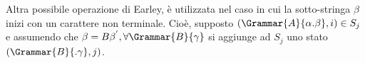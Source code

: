 \documentclass{subfiles}
\begin{document}
Altra possibile operazione di Earley, è utilizzata nel caso in cui la sotto-stringa \(\beta\) inizi con un carattere non terminale.
Cioè, supposto \((\Grammar{A}{\alpha . \beta} , i) \in S_{j}\) e assumendo che \(\beta = B\beta^{'}, \forall \Grammar{B}{\gamma}\) si aggiunge ad \(S_{j}\)
uno stato \((\Grammar{B}{.\gamma}, j)\).
\end{document}
